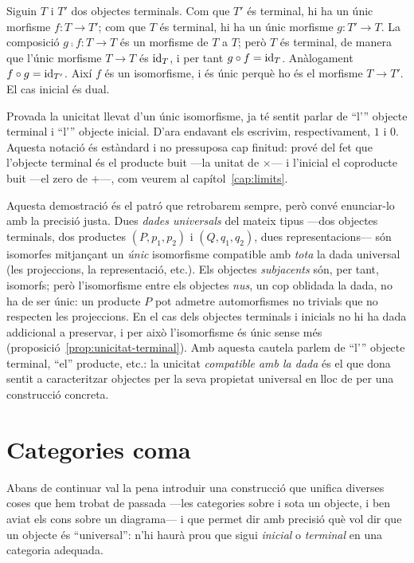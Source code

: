 \begin{prova}
Siguin $T$ i $T'$ dos objectes terminals. Com que $T'$ és terminal, hi ha un únic morfisme $f\colon T\to T'$; com que $T$ és terminal, hi ha un únic morfisme $g\colon T'\to T$. La composició $g\comp f\colon T\to T$ és un morfisme de $T$ a $T$; però $T$ és terminal, de manera que l'únic morfisme $T\to T$ és $\operatorname{id}_T$, i per tant $g\circ f=\operatorname{id}_T$. Anàlogament $f\circ g=\operatorname{id}_{T'}$. Així $f$ és un isomorfisme, i és únic perquè ho és el morfisme $T\to T'$. El cas inicial és dual.
\end{prova}

Provada la unicitat llevat d'un únic isomorfisme, ja té sentit parlar de \enquote{l'} objecte terminal i \enquote{l'} objecte inicial. D'ara endavant els escrivim, respectivament, $1$ i $0$. Aquesta notació és estàndard i no pressuposa cap finitud: prové del fet que l'objecte terminal és el producte buit ---la unitat de $\times$--- i l'inicial el coproducte buit ---el zero de $+$---, com veurem al capítol~\ref{cap:limits}.

\begin{observacio}
Aquesta demostració és el patró que retrobarem sempre, però convé enunciar-lo amb la precisió justa. Dues \emph{dades universals} del mateix tipus ---dos objectes terminals, dos productes $(P,p_1,p_2)$ i $(Q,q_1,q_2)$, dues representacions--- són isomorfes mitjançant un \emph{únic} isomorfisme compatible amb \emph{tota} la dada universal (les projeccions, la representació, etc.). Els objectes \emph{subjacents} són, per tant, isomorfs; però l'isomorfisme entre els objectes \emph{nus}, un cop oblidada la dada, no ha de ser únic: un producte $P$ pot admetre automorfismes no trivials que no respecten les projeccions. En el cas dels objectes terminals i inicials no hi ha dada addicional a preservar, i per això l'isomorfisme és únic sense més (proposició~\ref{prop:unicitat-terminal}). Amb aquesta cautela parlem de \enquote{l'} objecte terminal, \enquote{el} producte, etc.: la unicitat \emph{compatible amb la dada} és el que dona sentit a caracteritzar objectes per la seva propietat universal en lloc de per una construcció concreta.
\end{observacio}

\section{Categories coma}\label{sec:coma}

Abans de continuar val la pena introduir una construcció que unifica diverses coses que hem trobat de passada ---les categories sobre i sota un objecte, i ben aviat els cons sobre un diagrama--- i que permet dir amb precisió què vol dir que un objecte és \enquote{universal}: n'hi haurà prou que sigui \emph{inicial} o \emph{terminal} en una categoria adequada.

